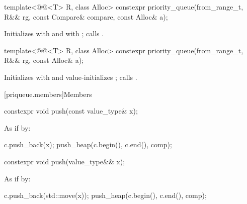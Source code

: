 %
\begin{itemdecl}
template<@@<T> R, class Alloc>
  constexpr priority_queue(from_range_t, R&& rg, const Compare& compare, const Alloc& a);
\end{itemdecl}

\begin{itemdescr}
\pnum
\effects
Initializes  with  and
 with ;
calls .
\end{itemdescr}

%
\begin{itemdecl}
template<@@<T> R, class Alloc>
  constexpr priority_queue(from_range_t, R&& rg, const Alloc& a);
\end{itemdecl}

\begin{itemdescr}
\pnum
\effects
Initializes
 with 
and value-initializes ;
calls .
\end{itemdescr}

[priqueue.members]{Members}

%
\begin{itemdecl}
constexpr void push(const value_type& x);
\end{itemdecl}

\begin{itemdescr}
\pnum
\effects
As if by:
\begin{codeblock}
c.push_back(x);
push_heap(c.begin(), c.end(), comp);
\end{codeblock}
\end{itemdescr}

%
\begin{itemdecl}
constexpr void push(value_type&& x);
\end{itemdecl}

\begin{itemdescr}
\pnum
\effects
As if by:
\begin{codeblock}
c.push_back(std::move(x));
push_heap(c.begin(), c.end(), comp);
\end{codeblock}
\end{itemdescr}

